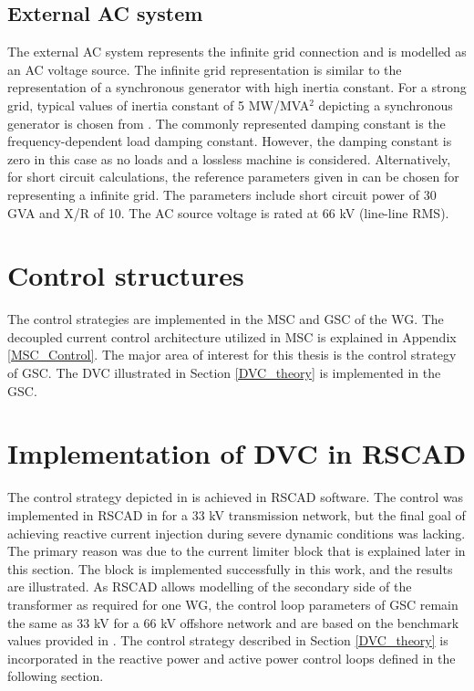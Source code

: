 \subsection{External AC system}\label{ext_AC_source}
The external \gls{AC} system represents the infinite grid connection and is modelled as an \gls{AC} voltage source. The infinite grid representation is similar to the representation of a synchronous generator with high inertia constant. For a strong grid, typical values of inertia constant of 5 MW/MVA$^2$ depicting a synchronous generator is chosen from \cite{kothari2003modern}. The commonly represented damping constant is the frequency-dependent load damping constant. However, the damping constant is zero in this case as no loads and a lossless machine is considered. Alternatively, for short circuit calculations, the reference parameters given in \cite{wachal2014guide} can be chosen for representing a infinite grid. The parameters include short circuit power of 30 GVA and X/R of 10. The \gls{AC} source voltage is rated at 66 kV (line-line RMS).

\section{Control structures}
The control strategies are implemented in the \gls{MSC} and \gls{GSC} of the \gls{WG}. The decoupled current control architecture utilized in \gls{MSC} is explained in Appendix \ref{MSC_Control}. The major area of interest for this thesis is the control strategy of \gls{GSC}. The \gls{DVC} illustrated in Section \ref{DVC_theory} is implemented in the \gls{GSC}.   

\section{Implementation of DVC in RSCAD}\label{DVC_RSCAD}
The control strategy depicted in \cite{korai_dynamic_2019} is achieved in RSCAD software. The control was implemented in RSCAD in \cite{sethi_real-time_nodate-new} for a 33 kV transmission network, but the final goal of achieving reactive current injection during severe dynamic conditions was lacking. The primary reason was due to the current limiter block that is explained later in this section. The block is implemented successfully in this work, and the results are illustrated. 
As RSCAD allows modelling of the secondary side of the transformer as required for one \gls{WG}, the control loop parameters of \gls{GSC} remain the same as 33 kV for a 66 kV offshore network and are based on the benchmark values provided in \cite{korai_98_nodate}. The control strategy described in Section \ref{DVC_theory} is incorporated in the reactive power and active power control loops defined in the following section. 

